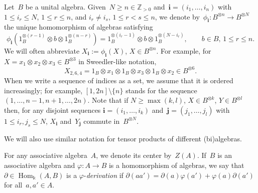 \documentclass[12pt, reqno]{amsart}
\theoremstyle{definition}
\numberwithin{equation}{section}
\newcommand{\tensor}{\otimes}
\newcommand{\kk}{\mathbb{k}}\newcommand{\lie}[1]{{\mathfrak{#1}}}
\newcommand{\ZZ}{{\mathbb Z}}
\DeclareMathOperator{\Hom}{Hom}
\begin{document}
Let~$B$ be a unital algebra. Given~$N\ge n\in\ZZ_{>0}$ and~$\mathbf i=(i_1,\dots,i_n)$ with
$1\le i_r\le N$, $1\le r\le n$, 
and $i_r\not=i_s$, $1\le r<s\le n$, we denote by~$\phi_{\mathbf i}:B^{\tensor n}\to B^{\tensor N}$ the unique homomorphism of algebras satisfying 
$$
\phi_{\mathbf i}(1_B^{\tensor (r-1)}\tensor b\tensor 
1_B^{\tensor (n-r)})=1_B^{\tensor (i_r-1)}\tensor b
\tensor 1_B^{\tensor (N-i_r)},\qquad b\in B,\,1\le r\le n.
$$
We will often abbreviate $X_{\mathbf i}:=\phi_{\mathbf i}(X)$, $X\in B^{\tensor n}$.
For example, for~$X=x_1\tensor x_2\tensor x_3\in B^{\tensor 3}$ in Sweedler-like notation, 
$$
X_{2,6,4}=1_B\tensor x_1\tensor 1_B\tensor x_3 \tensor 1_B\tensor x_2\in B^{\tensor 6}.
$$
When we write a sequence of indices as a set,
we assume that it is ordered increasingly; for example, $[1,2n]\setminus\{n\}$ stands for the sequence $(1,\dots,n-1,n+1,\dots,2n)$. 
Note that if $N\ge \max(k,l)$, $X\in B^{\tensor k}$, $Y\in B^{\tensor l}$ then, for any disjoint sequences $\mathbf i=(i_1,\dots,i_k)$
and~$\mathbf j=(j_1,\dots,j_l)$
with $1\le i_r,j_s\le N$, 
$X_{\mathbf i}$ and~$Y_{\mathbf j}$
commute in~$B^{\tensor N}$.


We will also use similar notation for tensor products of different (bi)algebras.

For any associative algebra~$A$, we denote its center by~$Z(A)$. If~$B$ is an associative algebra and
$\varphi:A\to B$ is a homomorphism of algebras,
we say that~$\partial\in\Hom_\kk(A,B)$ is a $\varphi$-{\em derivation} if $\partial(aa')=\partial(a)\varphi(a')+\varphi(a)\partial(a')$
for all~$a,a'\in A$.
\end{document}
